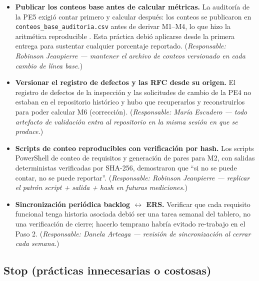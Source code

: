 \begin{itemize}[leftmargin=0.8cm]
  \item \textbf{Publicar los conteos base antes de calcular m\'etricas.} La auditor\'ia de la PE5 exigi\'o contar primero y calcular despu\'es: los conteos se publicaron en \texttt{conteos\_base\_auditoria.csv} antes de derivar M1--M4, lo que hizo la aritm\'etica reproducible \cite{wohlin2012}. Esta pr\'actica debi\'o aplicarse desde la primera entrega para sustentar cualquier porcentaje reportado. (\emph{Responsable: Robinson Jeanpierre --- mantener el archivo de conteos versionado en cada cambio de l\'inea base.})
  \item \textbf{Versionar el registro de defectos y las RFC desde su origen.} El registro de defectos de la inspecci\'on y las solicitudes de cambio de la PE4 no estaban en el repositorio hist\'orico y hubo que recuperarlos y reconstruirlos para poder calcular M6 (correcci\'on). (\emph{Responsable: Mar\'ia Escudero --- todo artefacto de validaci\'on entra al repositorio en la misma sesi\'on en que se produce.})
  \item \textbf{Scripts de conteo reproducibles con verificaci\'on por hash.} Los scripts PowerShell de conteo de requisitos y generaci\'on de pares para M2, con salidas deterministas verificadas por SHA-256, demostraron que ``si no se puede contar, no se puede reportar''. (\emph{Responsable: Robinson Jeanpierre --- replicar el patr\'on script + salida + hash en futuras mediciones.})
  \item \textbf{Sincronizaci\'on peri\'odica backlog $\leftrightarrow$ ERS.} Verificar que cada requisito funcional tenga historia asociada debi\'o ser una tarea semanal del tablero, no una verificaci\'on de cierre; hacerlo temprano habr\'ia evitado re-trabajo en el Paso 2. (\emph{Responsable: Danela Arteaga --- revisi\'on de sincronizaci\'on al cerrar cada semana.})
\end{itemize}

\subsection{Stop (pr\'acticas innecesarias o costosas)}

